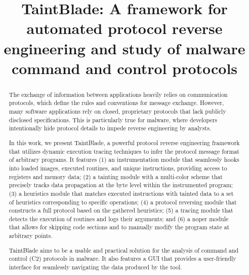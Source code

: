 \documentclass[conference]{IEEEtran}
\begin{document}
\title{TaintBlade: A framework for automated protocol reverse engineering and study of malware command and control protocols
}

\author{
    \and
}

\maketitle

\begin{abstract}
    The exchange of information between applications heavily relies on
    communication protocols, which define the rules and conventions for message exchange.
    However, many software applications rely on closed, proprietary protocols that lack publicly
    disclosed specifications. This is particularly true for malware, where developers intentionally
    hide protocol details to impede reverse engineering by analysts.

    In this work, we present TaintBlade, a powerful protocol reverse engineering
    framework that utilizes dynamic execution tracing techniques to infer the
    protocol message format of arbitrary programs. It features (1) an
    instrumentation module that seamlessly hooks into loaded images, executed
    routines, and unique instructions, providing access to registers and memory
    data; (2) a tainting module with a multi-color scheme that precisely tracks
    data propagation at the byte level within the instrumented program; (3) a
    heuristics module that matches executed instructions with tainted data to a set
    of heuristics corresponding to specific operations; (4) a protocol reversing
    module that constructs a full protocol based on the gathered heuristics; (5) a
    tracing module that detects the execution of routines and logs their arguments;
    and (6) a noper module that allows for skipping code sections and to manually
    modify the program state at arbitrary points.

    TaintBlade aims to be a usable and practical solution for the analysis of
    command and control (C2) protocols in malware. It also features a GUI that
    provides a user-friendly interface for seamlessly navigating the data produced
    by the tool.
\end{abstract}
\end{document}
